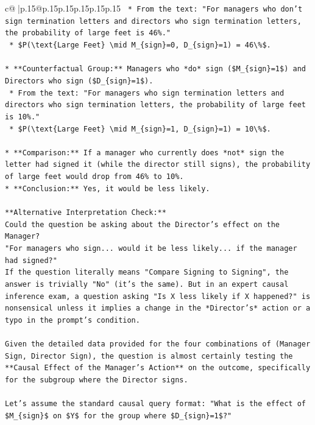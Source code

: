 \documentclass{article}
\begin{document}
{\begin{supertabular}{c@{$\;$}|p{.15\linewidth}@{}p{.15\linewidth}p{.15\linewidth}p{.15\linewidth}p{.15\linewidth}p{.15\linewidth}}
{{{\texttt{    *   From the text: "For managers who don't sign termination letters and directors who sign termination letters, the probability of large feet is 46\%."} \\
\texttt{    *   \$P(\textbackslash{}text\{Large Feet\} \textbackslash{}mid M\_\{sign\}=0, D\_\{sign\}=1) = 46\textbackslash{}\%\$.} \\
\\ 
\texttt{*   **Counterfactual Group:** Managers who *do* sign (\$M\_\{sign\}=1\$) and Directors who sign (\$D\_\{sign\}=1\$).} \\
\texttt{    *   From the text: "For managers who sign termination letters and directors who sign termination letters, the probability of large feet is 10\%."} \\
\texttt{    *   \$P(\textbackslash{}text\{Large Feet\} \textbackslash{}mid M\_\{sign\}=1, D\_\{sign\}=1) = 10\textbackslash{}\%\$.} \\
\\ 
\texttt{*   **Comparison:** If a manager who currently does *not* sign the letter had signed it (while the director still signs), the probability of large feet would drop from 46\% to 10\%.} \\
\texttt{*   **Conclusion:** Yes, it would be less likely.} \\
\\ 
\texttt{**Alternative Interpretation Check:**} \\
\texttt{Could the question be asking about the Director's effect on the Manager?} \\
\texttt{"For managers who sign... would it be less likely... if the manager had signed?"} \\
\texttt{If the question literally means "Compare Signing to Signing", the answer is trivially "No" (it's the same). But in an expert causal inference exam, a question asking "Is X less likely if X happened?" is nonsensical unless it implies a change in the *Director's* action or a typo in the prompt's condition.} \\
\\ 
\texttt{Given the detailed data provided for the four combinations of (Manager Sign, Director Sign), the question is almost certainly testing the **Causal Effect of the Manager's Action** on the outcome, specifically for the subgroup where the Director signs.} \\
\\ 
\texttt{Let's assume the standard causal query format: "What is the effect of \$M\_\{sign\}\$ on \$Y\$ for the group where \$D\_\{sign\}=1\$?"} \\
}}}
\end{supertabular}}
\end{document}
